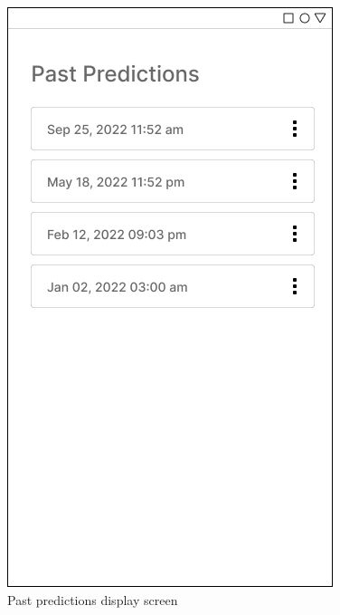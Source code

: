 \documentclass[12pt, a4paper]{article}
\begin{document}
\begin{figure}[h]
    \centering
    \setlength{\fboxsep}{8pt}
    \includegraphics[scale=0.45, fbox]{Predictions.png}
    \caption{Past predictions display screen}
    \label{fig:past_predictions}
\end{figure}
\clearpage
\end{document}

